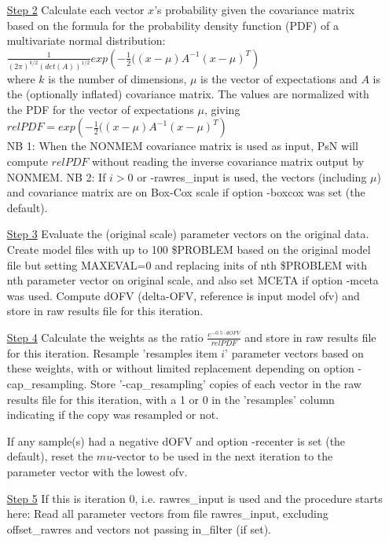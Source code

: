 \begin{itemize}
\item[\underline{Step 2}]
Calculate each vector $x$’s probability given the covariance matrix based on the formula for the probability density function (PDF) of a multivariate normal distribution:\\
\begin{math}
\frac{1}{\left(2\pi\right)^{k/2}\left(det\left(A\right)\right)^{1/2}} exp\left(-\frac{1}{2}(\left(x-\mu\right)A^{-1} \left(x-\mu\right)^T\right)
\end{math}
\\
where $k$ is the number of dimensions, $\mu$ is the vector of expectations and $A$ is the (optionally inflated) covariance matrix. The values are normalized with the PDF for the vector of expectations $\mu$, giving\\
\begin{math}
relPDF=exp\left(-\frac{1}{2}(\left(x-\mu\right)A^{-1} \left(x-\mu\right)^T\right)
\end{math}
\\
NB 1: When the NONMEM covariance matrix is used as input, PsN will compute $relPDF$ without reading the inverse covariance matrix output by NONMEM.
NB 2: If $i>0$ or -rawres\_input is used, the vectors (including $\mu$) and covariance matrix are on Box-Cox scale if option -boxcox was set (the default).
\item[\underline{Step 3}]
Evaluate the (original scale) parameter vectors on the original data. Create model files with up to 100 \$PROBLEM based on the original model file but setting MAXEVAL=0 and replacing inits of nth \$PROBLEM with nth parameter vector on original scale, and also set MCETA if option -mceta was used. Compute dOFV (delta-OFV, reference is input model ofv) and store in raw results file for this iteration.
\item[\underline{Step 4}]
Calculate the weights as the ratio $\frac{e^{-0.5\cdot dOFV}}{relPDF}$ and store in raw results file for this iteration.
Resample 'resamples item $i$' parameter vectors based on these weights, with or without limited replacement depending on option -cap\_resampling. Store '-cap\_resampling' copies of each vector in the raw results file for this iteration, with a 1 or 0 in the 'resamples' column indicating if the copy was resampled or not.

\noindent If any sample(s) had a negative dOFV and option -recenter is set (the default), reset the $mu$-vector to be used in the next iteration to the parameter vector with the lowest ofv.
\item[\underline{Step 5}]
If this is iteration $0$, i.e. rawres\_input is used and the procedure starts here: Read all parameter vectors from file rawres\_input, excluding offset\_rawres and vectors not passing in\_filter (if set).


\end{itemize}
